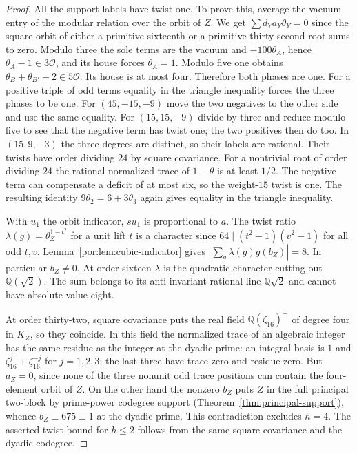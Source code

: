 \documentclass[11pt,a4paper]{article}
\numberwithin{equation}{section}
\theoremstyle{remark}
\newcommand{\QQ}{\mathbb Q}
\begin{document}
\begin{proof}
All the support labels have twist one. To prove this, average the vacuum entry of the modular relation over the orbit of $Z$. We get $\sum d_Y a_Y\theta_Y=0$ since the square orbit of either a primitive sixteenth or a primitive thirty-second root sums to zero. Modulo three the sole terms are the vacuum and $-100\theta_A$, hence $\theta_A-1\in3\mathcal O$, and its house forces $\theta_A=1$. Modulo five one obtains $\theta_B+\theta_{B'}-2\in5\mathcal O$. Its house is at most four. Therefore both phases are one. For a positive triple of odd terms equality in the triangle inequality forces the three phases to be one. For $(45,-15,-9)$ move the two negatives to the other side and use the same equality. For $(15,15,-9)$ divide by three and reduce modulo five to see that the negative term has twist one; the two positives then do too. In $(15,9,-3)$ the three degrees are distinct, so their labels are rational. Their twists have order dividing $24$ by square covariance. For a nontrivial root of order dividing $24$ the rational normalized trace of $1-\theta$ is at least $1/2$. The negative term can compensate a deficit of at most six, so the weight-$15$ twist is one. The resulting identity $9\theta_2=6+3\theta_3$ again gives equality in the triangle inequality.

With $u_1$ the orbit indicator, $su_1$ is proportional to $a$. The twist ratio $\lambda(g)=\theta_Z^{1-t^2}$ for a unit lift $t$ is a character since $64\mid(t^2-1)(v^2-1)$ for all odd $t,v$. Lemma~\ref{por:lem:cubic-indicator} gives $|\sum_g\lambda(g)g(b_Z)|=8$. In particular $b_Z\ne0$. At order sixteen $\lambda$ is the quadratic character cutting out $\QQ(\sqrt2)$. The sum belongs to its anti-invariant rational line $\QQ\sqrt2$ and cannot have absolute value eight.

At order thirty-two, square covariance puts the real field $\QQ(\zeta_{16})^+$ of degree four in $K_Z$, so they coincide. In this field the normalized trace of an algebraic integer has the same residue as the integer at the dyadic prime: an integral basis is $1$ and $\zeta_{16}^j+\zeta_{16}^{-j}$ for $j=1,2,3$; the last three have trace zero and residue zero. But $a_Z=0$, since none of the three nonunit odd trace positions can contain the four-element orbit of $Z$. On the other hand the nonzero $b_Z$ puts $Z$ in the full principal two-block by prime-power codegree support (Theorem~\ref{thm:principal-support}), whence $b_Z\equiv675\equiv1$ at the dyadic prime. This contradiction excludes $h=4$. The asserted twist bound for $h\le2$ follows from the same square covariance and the dyadic codegree.
\end{proof}
\end{document}
